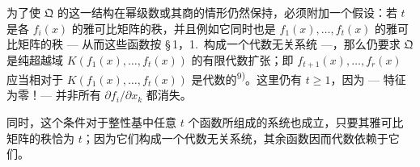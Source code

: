 为了使 $\mathfrak{Q}$ 的这一结构在幂级数或其商的情形仍然保持，必须附加一个假设：若 $t$ 是各 $f_i(x)$ 的雅可比矩阵的秩，并且例如它同时也是 $f_1(x),\ldots,f_t(x)$ 的雅可比矩阵的秩 --- 从而这些函数按 \S\,1，1.\ 构成一个代数无关系统 ---，那么仍要求 $\mathfrak{Q}$ 是纯超越域 $K(f_1(x),\ldots,f_t(x))$ 的有限代数扩张；即 $f_{t+1}(x),\ldots,f_r(x)$ 应当相对于 $K(f_1(x),\ldots,f_t(x))$ 是代数的\textsuperscript{9)}。这里仍有 $t \geq 1$，因为 --- 特征为零！--- 并非所有 $\partial f_i/\partial x_k$ 都消失。

同时，这个条件对于整性基中任意 $t$ 个函数所组成的系统也成立，只要其雅可比矩阵的秩恰为 $t$；因为它们构成一个代数无关系统，其余函数因而代数依赖于它们。
